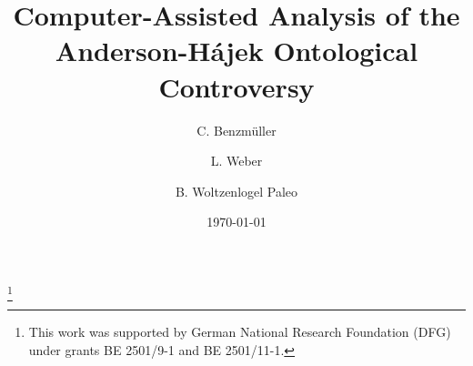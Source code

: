 \documentclass{birkjour}
\theoremstyle{definition}
\theoremstyle{remark}
\numberwithin{equation}{section}
\begin{document}
%
%
%
%
%
%
%
%
%


\title[The Anderson-Hájek Ontological Controversy]
{Computer-Assisted Analysis of the \\
Anderson-Hájek Ontological Controversy}



\author[Benzm\"uller]{C. Benzm\"uller}

\address{%
Dep.~of Mathematics and Computer Science, Freie Universit\"at Berlin, Germany
}

\thanks{This work was supported by German National Research Foundation (DFG) under
 grants BE 2501/9-1 and BE 2501/11-1.}


\author[Weber]{L. Weber}
\address{
Dep.~of Mathematics and Computer Science, Freie Universit\"at Berlin, Germany
}


\author[Woltzenlogel-Paleo]{B. Woltzenlogel Paleo}
\address{
Room HA0402, Favoritenstra{\ss}e 9, 1040 Wien, Austria
}






\date{\today}
\dedicatory{ }


\maketitle
\end{document}
